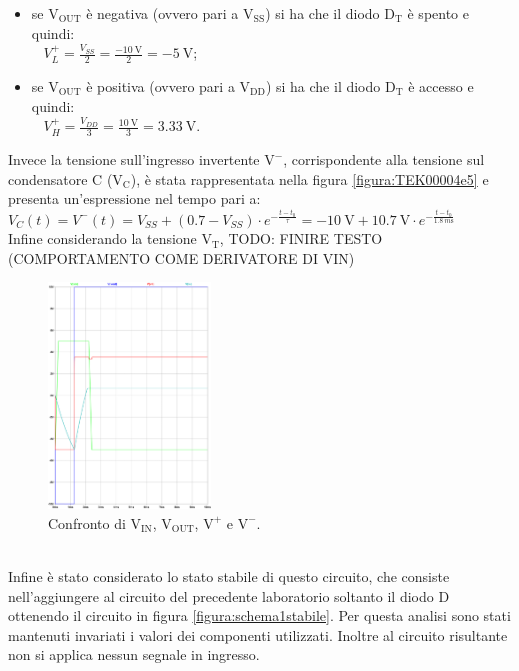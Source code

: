 \documentclass{report}
\begin{document}
\begin{itemize}
	\item se $\mathrm{V_{OUT}}$ è negativa (ovvero pari a $\mathrm{V_{SS}}$) si ha che il diodo $\mathrm{D_T}$ è spento e quindi:
	\\[4pt]$\displaystyle{\;\;\;V_L^+=\frac{V_{SS}}{2}=\frac{\SI{-10}{\volt}}{2}=\SI{-5}{\volt}}$;
	\item se $\mathrm{V_{OUT}}$ è positiva (ovvero pari a $\mathrm{V_{DD}}$) si ha che il diodo $\mathrm{D_T}$ è accesso e quindi:
	\\[4pt]$\displaystyle{\;\;\;V_H^+=\frac{V_{DD}}{3}=\frac{\SI{10}{\volt}}{3}=\SI{3.33}{\volt}}$.
\end{itemize}
Invece la tensione sull'ingresso invertente $\mathrm{V^-}$, corrispondente alla tensione sul condensatore C ($\mathrm{V_C}$), è stata rappresentata nella figura \ref{figura:TEK00004e5} e presenta un'espressione nel tempo pari a:
\\[4pt]\indent$\displaystyle{V_C(t)=V^-(t)=V_{SS}+(0.7-V_{SS})\cdot e^{-\frac{t-t_0}{\tau}}=\SI{-10}{\volt}+\SI{10.7}{\volt}\cdot e^{-\frac{t-t_0}{\SI{1.8}{m\second}}}}$
\\Infine considerando la tensione $\mathrm{V_T}$, TODO: FINIRE TESTO (COMPORTAMENTO COME DERIVATORE DI VIN)
\begin{figure}[h]
	\centering
	\includegraphics[height=6cm]{immagini/plot_sim}
	\caption{Confronto di $\mathrm{V_{IN}}$, $\mathrm{V_{OUT}}$, $\mathrm{V^+}$ e $\mathrm{V^-}$.}
	\label{figura:simulazione}
\end{figure}
\\Infine è stato considerato lo stato stabile di questo circuito, che consiste nell'aggiungere al circuito del precedente laboratorio soltanto il diodo D ottenendo il circuito in figura \ref{figura:schema1stabile}. Per questa analisi sono stati mantenuti invariati i valori dei componenti utilizzati. Inoltre al circuito risultante non si applica nessun segnale in ingresso.
\end{document}
